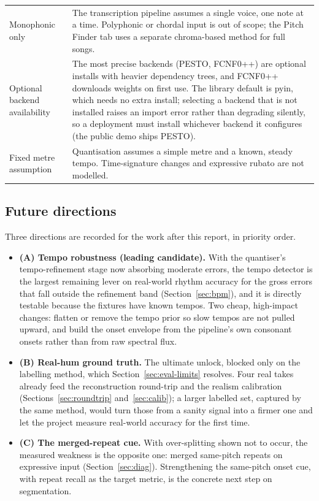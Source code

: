\documentclass[12pt,a4paper]{article}
\begin{document}
\begin{longtable}{>{\raggedright\arraybackslash}p{} >{\raggedright\arraybackslash}p{}}
\addlinespace
Monophonic only & The transcription pipeline assumes a single voice, one note
at a time. Polyphonic or chordal input is out of scope; the Pitch Finder tab
uses a separate chroma-based method for full songs. \\
\addlinespace
Optional backend availability & The most precise backends (PESTO, FCNF0++) are
optional installs with heavier dependency trees, and FCNF0++ downloads weights
on first use. The library default is pyin, which needs no extra install;
selecting a backend that is not installed raises an import error rather than
degrading silently, so a deployment must install whichever backend it configures
(the public demo ships PESTO). \\
\addlinespace
Fixed metre assumption & Quantisation assumes a simple metre and a known,
steady tempo. Time-signature changes and expressive rubato are not modelled. \\
\end{longtable}

\subsection{Future directions}
\label{sec:directions}

Three directions are recorded for the work after this report, in priority
order.

\begin{itemize}
    \item \textbf{(A) Tempo robustness (leading candidate).} With the quantiser's
    tempo-refinement stage now absorbing moderate errors, the tempo detector is
    the largest remaining lever on real-world rhythm accuracy for the gross errors
    that fall outside the refinement band (Section~\ref{sec:bpm}), and it is
    directly testable because the fixtures have known tempos. Two cheap,
    high-impact changes: flatten or remove the tempo prior so slow tempos are not
    pulled upward, and build the onset envelope from the pipeline's own consonant
    onsets rather than from raw spectral flux.
    \item \textbf{(B) Real-hum ground truth.} The ultimate unlock, blocked only
    on the labelling method, which Section~\ref{sec:eval-limits} resolves. Four
    real takes already feed the reconstruction round-trip and the realism
    calibration (Sections~\ref{sec:roundtrip} and~\ref{sec:calib}); a larger
    labelled set, captured by the same method, would turn those from a sanity
    signal into a firmer one and let the project measure real-world accuracy for
    the first time.
    \item \textbf{(C) The merged-repeat cue.} With over-splitting shown not to
    occur, the measured weakness is the opposite one: merged same-pitch repeats on
    expressive input (Section~\ref{sec:diag}). Strengthening the same-pitch onset
    cue, with repeat recall as the target metric, is the concrete next step on
    segmentation.
\end{itemize}
\end{document}
